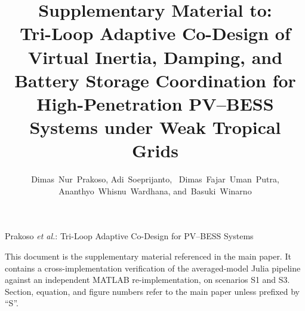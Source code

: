 \documentclass[journal]{IEEEtran}
\begin{document}
\sloppy

\title{Supplementary Material to:\\
Tri-Loop Adaptive Co-Design of Virtual Inertia, Damping, and
Battery Storage Coordination for High-Penetration PV--BESS Systems
under Weak Tropical Grids}

\author{Dimas~Nur~Prakoso,
        Adi~Soeprijanto,~
        Dimas~Fajar~Uman~Putra,
        Ananthyo~Whisnu~Wardhana,
        and~Basuki~Winarno}

%
{Prakoso \MakeLowercase{\textit{et al.}}: Tri-Loop Adaptive Co-Design for PV--BESS Systems}

\maketitle

\noindent This document is the supplementary material referenced in
the main paper. It contains a cross-implementation verification of
the averaged-model Julia pipeline against an independent MATLAB
re-implementation, on scenarios S1 and S3. Section, equation, and
figure numbers refer to the main paper unless prefixed by ``S''.


\end{document}
